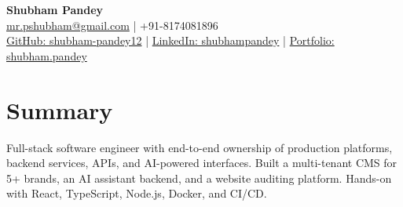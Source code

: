 \documentclass[a4paper,10pt]{article}
\begin{document}
\begin{center}
{\LARGE\textbf{Shubham Pandey}}\\[3pt]
\href{mailto:mr.pshubham@gmail.com}{mr.pshubham@gmail.com} | +91-8174081896\\[2pt]
\href{https://github.com/shubham-pandey12}{GitHub: shubham-pandey12} | \href{https://www.linkedin.com/in/shubham-pandey-a74716199/}{LinkedIn: shubhampandey} | \href{https://shubham-portfolio-mocha.vercel.app/}{Portfolio: shubham.pandey}
\end{center}
\section{Summary}
Full-stack software engineer with end-to-end ownership of production platforms, backend services, APIs, and AI-powered interfaces. Built a multi-tenant CMS for 5+ brands, an AI assistant backend, and a website auditing platform. Hands-on with React, TypeScript, Node.js, Docker, and CI/CD.
\end{document}
